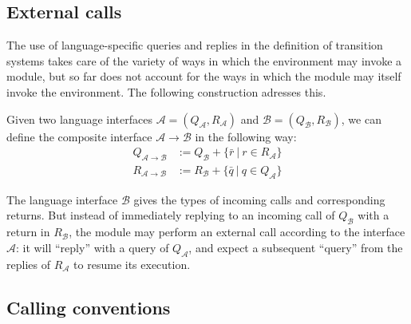 \documentclass[acmsmall,10pt,review,anonymous]{acmart}
\begin{document}

\subsection{External calls} %

The use of language-specific queries and replies
in the definition of transition systems
takes care of the variety of ways
in which the environment may invoke a module,
but so far does not account for the ways in which
the module may itself invoke the environment.
The following construction adresses this.

\begin{definition}
Given two language interfaces
$\mathcal{A} = (Q_\mathcal{A}, R_\mathcal{A})$ and
$\mathcal{B} = (Q_\mathcal{B}, R_\mathcal{B})$,
we can define the composite interface
$\mathcal{A} \rightarrow \mathcal{B}$
in the following way:
\begin{align*}
  Q_{\mathcal{A} \rightarrow \mathcal{B}} &:=
    Q_\mathcal{B} + \{ \bar{r} \:|\: r \in R_\mathcal{A} \} \\
  R_{\mathcal{A} \rightarrow \mathcal{B}} &:=
    R_\mathcal{B} + \{ \bar{q} \:|\: q \in Q_\mathcal{A} \}
\end{align*}
\end{definition}

The language interface $\mathcal{B}$
gives the types of incoming calls and corresponding returns.
But instead of immediately replying to an incoming call of $Q_\mathcal{B}$
with a return in $R_\mathcal{B}$,
the module may perform an external call
according to the interface $\mathcal{A}$:
it will ``reply'' with a query of $Q_\mathcal{A}$,
and expect a subsequent ``query'' from the replies of $R_\mathcal{A}$
to resume its execution.


\subsection{Calling conventions} \label{sec:callconv} %
\end{document}
